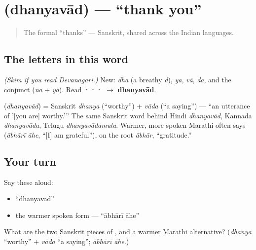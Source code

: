 \section[dhanyavad]{ (dhanyavād) — \textquotedblleft{}thank you\textquotedblright{}}

\label{lesson:MR-C01-dhanyavad}



\begin{quote}
The formal \textquotedblleft{}thanks\textquotedblright{} — Sanskrit, shared across the Indian languages.
\end{quote}

\subsection*{The letters in this word}
\emph{(Skim if you read Devanagari.)} New: \textbf{} \emph{dha} (a breathy \emph{d}), \textbf{} \emph{ya}, \textbf{} \emph{vā}, \textbf{} \emph{da}, and the conjunct \textbf{} (\emph{na} + \emph{ya}). Read \textbf{···} $\to$ \textbf{dhanyavād}.

\begin{cousinweb}
\textbf{} (\emph{dhanyavād}) = Sanskrit \emph{dhanya} (\textquotedblleft{}worthy\textquotedblright{}) + \emph{vāda} (\textquotedblleft{}a saying\textquotedblright{}) — \textquotedblleft{}an utterance of '{[}you are{]} worthy.'\textquotedblright{} The same Sanskrit word behind Hindi \emph{dhanyavād}, Kannada \emph{dhanyavāda}, Telugu \emph{dhanyavādamulu}. Warmer, more spoken Marathi often says \textbf{ } (\emph{ābhārī āhe}, \textquotedblleft{}{[}I{]} am grateful\textquotedblright{}), on the root \emph{ābhār}, \textquotedblleft{}gratitude.\textquotedblright{}
\end{cousinweb}

\subsection*{Your turn}
Say these aloud:

\begin{itemize}
\raggedright
  \item \textquotedblleft{}dhanyavād\textquotedblright{}
  \item the warmer spoken form — \textquotedblleft{}ābhārī āhe\textquotedblright{}
\end{itemize}

\begin{tcolorbox}[breakable,colback=teal!4,colframe=teal!35!black,title={Before you move on}]
What are the two Sanskrit pieces of \textbf{}, and a warmer Marathi alternative? (\emph{dhanya} \textquotedblleft{}worthy\textquotedblright{} + \emph{vāda} \textquotedblleft{}a saying\textquotedblright{}; \emph{ābhārī āhe}.)
\end{tcolorbox}
